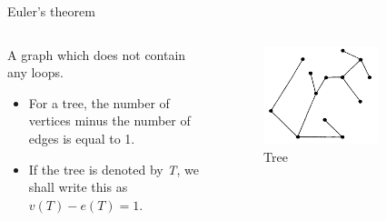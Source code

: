 \documentclass{beamer}
\begin{document}
\begin{frame}{Euler's theorem}
  \begin{columns}
    \begin{column}{0.5\textwidth}
      \begin{definition}[Tree]
        A graph which does not contain any loops.
        \begin{itemize}
        \item For a tree, the number of vertices minus the number of edges is equal to 1.
        \item If the tree is denoted by \textsl{T}, we shall write this as $v(T) - e(T) = 1$.
        \end{itemize}
      \end{definition}
    \end{column}
    \begin{column}{0.5\textwidth}
      \begin{figure}
        \centering
        \includegraphics[width=0.7\textwidth]{figure_1_4_a.png}
        \caption{Tree}
      \end{figure}
    \end{column}
  \end{columns}
\end{frame}
\end{document}
